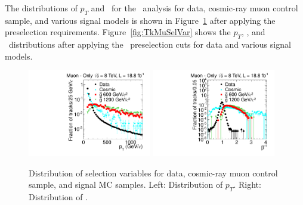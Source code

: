 The distributions of $p_T$ and \invbeta\ for the \muononly\ analysis for data, cosmic-ray muon control sample, and various signal models is 
shown in Figure~\ref{fig:MuOnlySelVar} after applying the preselection requirements. Figure~\ref{fig:TkMuSelVar} shows the $p_T$, \invbeta, and \dedx\
distributions after applying the \tktof\ preselection cuts for data and various signal models.

\begin{figure}
\centering
  \includegraphics[clip=false, trim=0.0cm 0cm 0.0cm 0cm, width=0.48\textwidth]{figures/muonly/Selection_Comp_8TeV_Cosmic_Pt_BS}
  \includegraphics[clip=false, trim=0.0cm 0cm 0.0cm 0cm, width=0.48\textwidth]{figures/muonly/Selection_Comp_8TeV_Cosmic_TOF_BS} \\
  \caption[Distribution of \invbeta\ and \pt\ in the \muononly\ analysis for data, cosmic-ray muon control sample, and signal MC samples]
{Distribution of selection variables for data, cosmic-ray muon control sample, and signal MC samples.
Left: Distribution of $p_T$. Right: Distribution of \invbeta.}
    \label{fig:MuOnlySelVar}
\end{figure}

